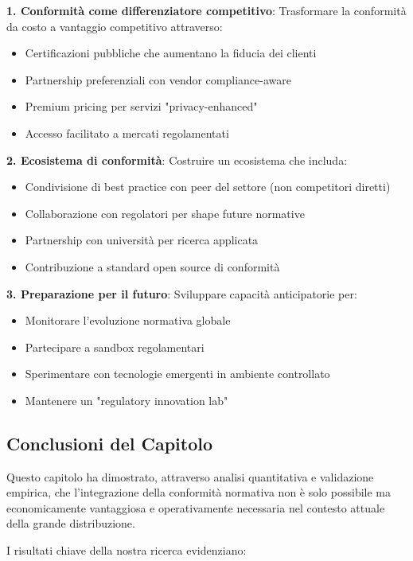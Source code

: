 \textbf{1. Conformità come differenziatore competitivo}:
Trasformare la conformità da costo a vantaggio competitivo attraverso:
\begin{itemize}
    \item Certificazioni pubbliche che aumentano la fiducia dei clienti
    \item Partnership preferenziali con vendor compliance-aware
    \item Premium pricing per servizi "privacy-enhanced"
    \item Accesso facilitato a mercati regolamentati
\end{itemize}

\textbf{2. Ecosistema di conformità}:
Costruire un ecosistema che includa:
\begin{itemize}
    \item Condivisione di best practice con peer del settore (non competitori diretti)
    \item Collaborazione con regolatori per shape future normative
    \item Partnership con università per ricerca applicata
    \item Contribuzione a standard open source di conformità
\end{itemize}

\textbf{3. Preparazione per il futuro}:
Sviluppare capacità anticipatorie per:
\begin{itemize}
    \item Monitorare l'evoluzione normativa globale
    \item Partecipare a sandbox regolamentari
    \item Sperimentare con tecnologie emergenti in ambiente controllato
    \item Mantenere un "regulatory innovation lab"
\end{itemize}

\subsection{\texorpdfstring{Conclusioni del Capitolo}{4.9.4 - Conclusioni del Capitolo}}
\label{subsec:4.9.4_conclusioni_capitolo}

Questo capitolo ha dimostrato, attraverso analisi quantitativa e validazione empirica, che l'integrazione della conformità normativa non è solo possibile ma economicamente vantaggiosa e operativamente necessaria nel contesto attuale della grande distribuzione.

I risultati chiave della nostra ricerca evidenziano:

